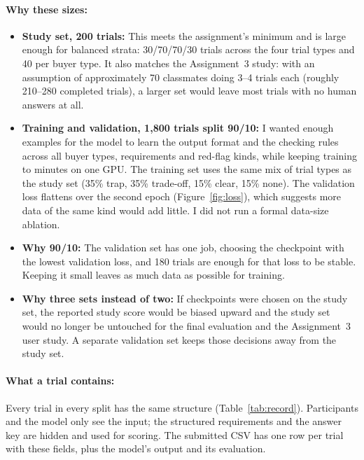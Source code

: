 \documentclass[11pt]{article}
\begin{document}
\paragraph{Why these sizes:}
\begin{itemize}
  \item \textbf{Study set, 200 trials:} This meets the assignment's minimum and is large enough
  for balanced strata: 30/70/70/30 trials across the four trial types and 40 per buyer type. It
  also matches the Assignment~3 study: with an assumption of approximately 70 classmates doing 3--4 trials each (roughly
  210--280 completed trials), a larger set would leave most trials with no human answers at all.
  \item \textbf{Training and validation, 1,800 trials split 90/10:} I wanted enough examples for
  the model to learn the output format and the checking rules across all buyer types,
  requirements and red-flag kinds, while keeping training to minutes on one GPU. The training set
  uses the same mix of trial types as the study set (35\% trap, 35\% trade-off, 15\% clear, 15\%
  none). The validation loss flattens over the second epoch (Figure~\ref{fig:loss}), which suggests
  more data of the same kind would add little. I did not run a formal data-size ablation.
  \item \textbf{Why 90/10:} The validation set has one job, choosing the checkpoint with the
  lowest validation loss, and 180 trials are enough for that loss to be stable. Keeping it small
  leaves as much data as possible for training.
  \item \textbf{Why three sets instead of two:} If checkpoints were chosen on the study set, the
  reported study score would be biased upward and the study set would no longer be untouched for
  the final evaluation and the Assignment~3 user study. A separate validation set keeps those
  decisions away from the study set.
\end{itemize}

\paragraph{What a trial contains:} Every trial in every split has the same structure
(Table~\ref{tab:record}). Participants and the model only see the input; the structured
requirements and the answer key are hidden and used for scoring. The submitted CSV has one row
per trial with these fields, plus the model's output and its evaluation.
\end{document}
